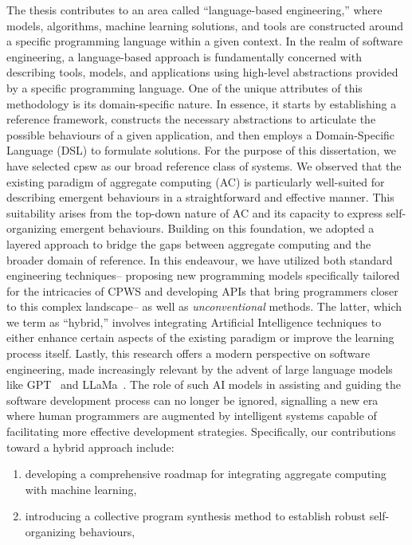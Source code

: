 \begin{refsection}
The thesis contributes to an area called ``language-based engineering,'' where models, algorithms, machine learning solutions, and tools are constructed around a specific programming language within a given context. 
In the realm of software engineering, 
 a language-based approach is fundamentally concerned with describing tools, models, and applications using high-level abstractions provided by a specific programming language. 
 One of the unique attributes of this methodology is its domain-specific nature. 
 In essence, it starts by establishing a reference framework, 
 constructs the necessary abstractions to articulate the possible behaviours of a given application, 
 and then employs a Domain-Specific Language (DSL) to formulate solutions.
%
For the purpose of this dissertation, 
 we have selected \ac{cpsw} as our broad reference class of systems. 
 We observed that the existing paradigm of aggregate computing (AC) 
 is particularly well-suited for describing emergent behaviours in a straightforward and effective manner. This suitability arises from the top-down nature of AC and its capacity to express self-organizing emergent behaviours.
%
Building on this foundation, 
 we adopted a layered approach to bridge the gaps between aggregate computing and the broader domain of reference. 
 In this endeavour, we have utilized both standard engineering techniques--
 proposing new programming models specifically tailored for the intricacies of CPWS and developing APIs that bring programmers closer to this complex landscape--
 as well as \emph{unconventional} methods. 
 The latter, which we term as ``hybrid,'' 
 involves integrating Artificial Intelligence techniques 
 to either enhance certain aspects of the existing paradigm or improve the learning process itself.
% 
Lastly, this research offers a modern perspective on software engineering, 
 made increasingly relevant by the advent of large language models like GPT~\cite{floridi2020gpt} and LLaMa~\cite{touvron2023llama}. 
 The role of such AI models in assisting and guiding the software development process can no longer be ignored, 
 signalling a new era where human programmers are augmented by intelligent systems capable of facilitating more effective development strategies.
Specifically, our contributions toward a hybrid approach include:
\begin{enumerate}
    \item developing a comprehensive roadmap for integrating aggregate computing with machine learning,
    \item introducing a collective program synthesis method to establish robust self-organizing behaviours,

\end{enumerate}
\end{refsection}
